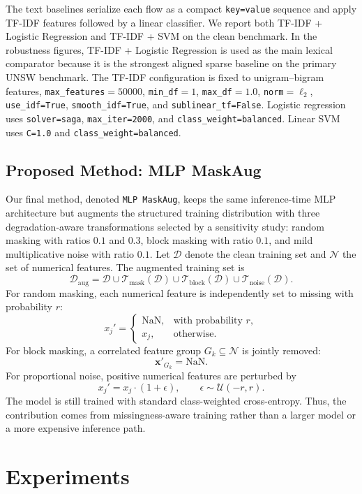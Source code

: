 The text baselines serialize each flow as a compact \texttt{key=value} sequence and apply TF-IDF features followed by a linear classifier. We report both TF-IDF + Logistic Regression and TF-IDF + SVM on the clean benchmark. In the robustness figures, TF-IDF + Logistic Regression is used as the main lexical comparator because it is the strongest aligned sparse baseline on the primary UNSW benchmark. The TF-IDF configuration is fixed to unigram--bigram features, \texttt{max\_features}$=50000$, \texttt{min\_df}$=1$, \texttt{max\_df}$=1.0$, \texttt{norm}$=\ell_2$, \texttt{use\_idf=True}, \texttt{smooth\_idf=True}, and \texttt{sublinear\_tf=False}. Logistic regression uses \texttt{solver=saga}, \texttt{max\_iter=2000}, and \texttt{class\_weight=balanced}. Linear SVM uses \texttt{C=1.0} and \texttt{class\_weight=balanced}.

\subsection{Proposed Method: MLP MaskAug}
Our final method, denoted \texttt{MLP MaskAug}, keeps the same inference-time MLP architecture but augments the structured training distribution with three degradation-aware transformations selected by a sensitivity study: random masking with ratios $0.1$ and $0.3$, block masking with ratio $0.1$, and mild multiplicative noise with ratio $0.1$. Let $\mathcal{D}$ denote the clean training set and $\mathcal{N}$ the set of numerical features. The augmented training set is
\[
\mathcal{D}_{\mathrm{aug}} =
\mathcal{D}
\cup \mathcal{T}_{\mathrm{mask}}(\mathcal{D})
\cup \mathcal{T}_{\mathrm{block}}(\mathcal{D})
\cup \mathcal{T}_{\mathrm{noise}}(\mathcal{D}).
\]
For random masking, each numerical feature is independently set to missing with probability $r$:
\[
x_j' =
\begin{cases}
\mathrm{NaN}, & \text{with probability } r,\\
x_j, & \text{otherwise}.
\end{cases}
\]
For block masking, a correlated feature group $G_k \subseteq \mathcal{N}$ is jointly removed:
\[
\mathbf{x}'_{G_k} = \mathrm{NaN}.
\]
For proportional noise, positive numerical features are perturbed by
\[
x_j' = x_j \cdot (1 + \epsilon), \qquad \epsilon \sim \mathcal{U}(-r, r).
\]
The model is still trained with standard class-weighted cross-entropy. Thus, the contribution comes from missingness-aware training rather than a larger model or a more expensive inference path.

\section{Experiments}
